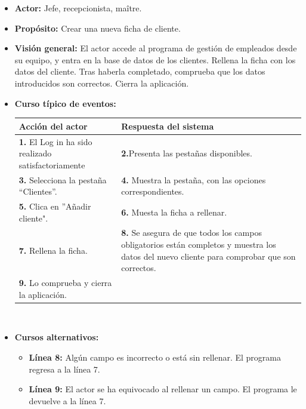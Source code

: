 \documentclass[spanish,a4paper,12pt]{report}	%
\begin{document}
			\begin{itemize}
			\item \textbf{Actor:} Jefe, recepcionista, maître.
			\item \textbf{Propósito: } Crear una nueva ficha de cliente.
			\item \textbf{Visión general:} El actor accede al programa de gestión de empleados desde su equipo, y entra en la base de datos de los clientes. Rellena la ficha con los datos del cliente. Tras haberla completado, comprueba que los datos introducidos son correctos. Cierra la aplicación. 
			\item \textbf{Curso típico de eventos:} 	\\
				\begin{tabular}{|p{6cm}||p{6cm}|}
				\hline
				\textbf{Acción del actor} & \textbf{Respuesta del sistema} \\ \hline \hline
				\textbf{1.} El Log in ha sido realizado satisfactoriamente & \textbf{2.}Presenta las pestañas disponibles.\\ \hline 
				\textbf{3.} Selecciona la pestaña “Clientes”. & \textbf{4.} Muestra la pestaña, con las opciones correspondientes. \\ \hline
				\textbf{5.} Clica en ''Añadir cliente".	& \textbf{6.} Muesta la ficha a rellenar. \\ \hline
				\textbf{7.} Rellena la ficha. & \textbf{8.} Se asegura de que todos los campos obligatorios están completos y muestra los datos del nuevo cliente para comprobar que son correctos.\\ \hline
				\textbf{9.} Lo comprueba y cierra la aplicación. & \textbf{} \\ \hline
			\end{tabular}
			\\
			\item \textbf{Cursos alternativos:} 
			\begin{itemize}
			\item  \textbf{Línea 8:} Algún campo es incorrecto o está sin rellenar. El programa regresa a la línea 7.
			\item  \textbf{Línea 9:} El actor se ha equivocado al rellenar un campo. El programa le devuelve a la línea 7.
			\end {itemize}
		\end{itemize}%


\end{document}
